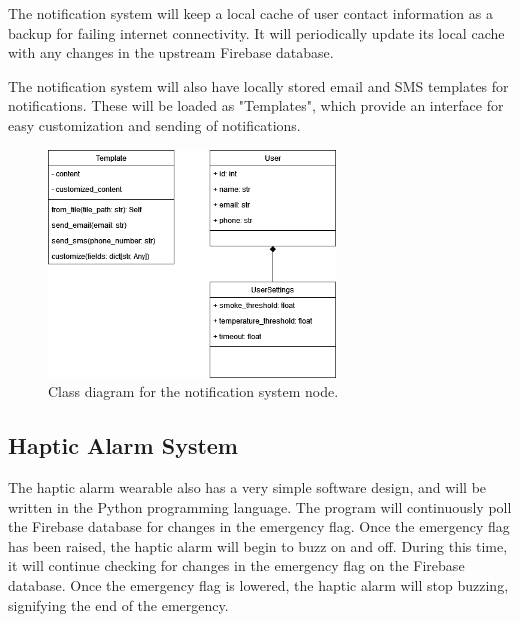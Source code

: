 The notification system will keep a local cache of user contact information as a backup for failing internet
connectivity. It will periodically update its local cache with any changes in the upstream Firebase database.

The notification system will also have locally stored email and SMS templates for notifications. These will be loaded
as "Templates", which provide an interface for easy customization and sending of notifications.

\begin{figure}[H]
    \centering
    \includegraphics[width=3in]{../assets/NotificationSystemClassDiagram.png}
    \caption{Class diagram for the notification system node.}
\end{figure}

\subsection{Haptic Alarm System}

The haptic alarm wearable also has a very simple software design, and will be written in the Python programming
language. The program will continuously poll the Firebase database for changes in the emergency flag. Once the
emergency flag has been raised, the haptic alarm will begin to buzz on and off. During this time, it will continue
checking for changes in the emergency flag on the Firebase database. Once the emergency flag is lowered, the haptic
alarm will stop buzzing, signifying the end of the emergency.

